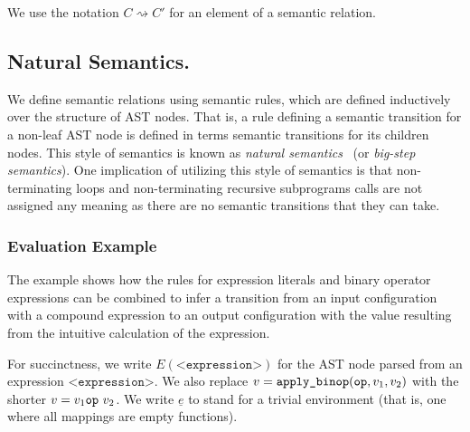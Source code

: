 \documentclass{book}
\newcommand\semantic[1]{\llbracket #1 \rrbracket}
\newcommand\evalarrow[0]{\rightsquigarrow}
\newcommand\env[0]{\texttt{env}}
\begin{document}
  We use the notation $C \evalarrow C'$ for an element of a semantic relation.

\subsection{Natural Semantics.}
We define semantic relations using semantic rules, which are defined inductively over the structure of AST nodes.
That is, a rule defining a semantic transition for a non-leaf AST node is defined in terms semantic transitions for its children nodes.
%
This style of semantics is known as \emph{natural semantics}~\cite{SemanticsWithApplicationsBook} (or \emph{big-step semantics}).
%
One implication of utilizing this style of semantics is that non-terminating loops and non-terminating
recursive subprograms calls are not assigned any meaning as there are no semantic transitions that they can take.

\subsubsection{Evaluation Example}

The example shows how the rules for expression literals and binary operator expressions can be combined
to infer a transition from an input configuration with a compound expression to an output configuration
with the value resulting from the intuitive calculation of the expression.

\newcommand\emptyenv[0]{\underline{e}}

For succinctness, we write $E(\texttt{<expression>})$
for the AST node parsed from an expression $\texttt{<expression>}$.
We also replace $v=\texttt{apply\_binop}(\texttt{op}, v_1, v_2)$ with the shorter $v=v_1 \op\ v_2$.
%
We write $\emptyenv$ to stand for a trivial environment (that is, one where all mappings are empty functions).
\end{document}
